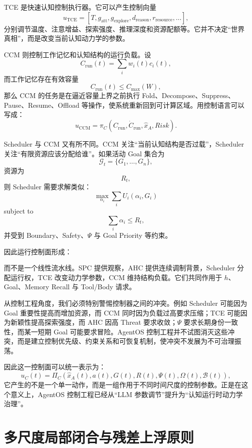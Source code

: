 TCE 是快速认知控制执行器。它可以产生控制向量
\[
u_{\mathrm{TCE}}
=
[
T,
g_{\mathrm{att}},
g_{\mathrm{explore}},
d_{\mathrm{reason}},
r_{\mathrm{resource}},
\ldots
],
\]
分别调节温度、注意增益、探索强度、推理深度和资源配额等。它并不决定“世界真相”，而是改变当前认知动力学的参数。

CCM 则控制工作记忆和认知结构的运行负载。设
\[
C_{\mathrm{run}}(t)
=
\sum_i
w_i(t)c_i(t),
\]
而工作记忆存在有效容量
\[
C_{\mathrm{run}}(t)
\le
C_{\max}(W),
\]
那么 CCM 的任务是在逼近容量上界之前执行 Fold、Decompose、Suppress、Pause、Resume、Offload 等操作，使系统重新回到可计算区域。用控制语言可以写成：
\[
u_{\mathrm{CCM}}
=
\pi_C(
C_{\mathrm{run}},
\dot C_{\mathrm{run}},
\hat x_A,
Risk
).
\]

Scheduler 与 CCM 又有所不同。CCM 关注“当前认知结构是否过载”，Scheduler 关注“有限资源应该分配给谁”。如果活动 Goal 集合为
\[
\mathcal G_t=\{G_1,\ldots,G_n\},
\]
资源为
\[
R_t,
\]
则 Scheduler 需要求解类似：
\[
\max_{\alpha_i}
\sum_i
U_i(\alpha_i,G_i)
\]
subject to
\[
\sum_i\alpha_i
\le
R_t,
\]
并受到 Boundary、Safety、$\Psi$ 与 Goal Priority 等约束。

因此运行控制面形成：
\begin{statementbox}
\centering
{}
\end{statementbox}
而不是一个线性流水线。SPC 提供观察，AHC 提供连续调制背景，Scheduler 分配运行权，TCE 改变动力学参数，CCM 维持结构负载。它们共同作用于 $h$、Goal、Memory Recall 与 Tool/Body 请求。

从控制工程角度，我们必须特别警惕控制器之间的冲突。例如 Scheduler 可能因为 Goal 重要性提高而增加资源，而 CCM 同时因为负载过高要求压缩；TCE 可能因为新颖性提高探索强度，而 AHC 因高 Threat 要求收敛；$\Psi$ 要求长期身份一致性，而某一短期 Goal 可能要求冒险。AgentOS 控制工程并不试图消灭这些冲突，而是建立控制优先级、约束关系和可恢复机制，使冲突不发展为不可治理振荡。

因此这一控制面可以统一表示为：
\[
u_C(t)
=
\Pi_C(
\hat x_A(t),
a(t),
G(t),
R(t),
\Psi(t),
\Omega(t),
\mathcal B(t)
),
\]
它产生的不是一个单一动作，而是一组作用于不同时间尺度的控制参数。正是在这个意义上，AgentOS 控制工程已经从“LLM 参数调节”提升为“认知运行时动力学治理”。

\section{多尺度局部闭合与残差上浮原则}

